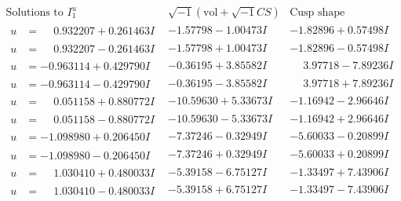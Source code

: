 \documentclass[1p]{elsarticle_modified}
\theoremstyle{definition}
\newcommand{\I}{\sqrt{-1}}
\begin{document}
$$\begin{array}{c|c|c}  
\text{Solutions to }I^u_{1}& \I (\text{vol} + \sqrt{-1}CS) & \text{Cusp shape}\\
 \hline 
\begin{aligned}
u &= \phantom{-}0.932207 + 0.261463 I\end{aligned}
 & -1.57798 - 1.00473 I & -1.82896 + 0.57498 I \\ \hline\begin{aligned}
u &= \phantom{-}0.932207 - 0.261463 I\end{aligned}
 & -1.57798 + 1.00473 I & -1.82896 - 0.57498 I \\ \hline\begin{aligned}
u &= -0.963114 + 0.429790 I\end{aligned}
 & -0.36195 + 3.85582 I & \phantom{-}3.97718 - 7.89236 I \\ \hline\begin{aligned}
u &= -0.963114 - 0.429790 I\end{aligned}
 & -0.36195 - 3.85582 I & \phantom{-}3.97718 + 7.89236 I \\ \hline\begin{aligned}
u &= \phantom{-}0.051158 + 0.880772 I\end{aligned}
 & -10.59630 + 5.33673 I & -1.16942 - 2.96646 I \\ \hline\begin{aligned}
u &= \phantom{-}0.051158 - 0.880772 I\end{aligned}
 & -10.59630 - 5.33673 I & -1.16942 + 2.96646 I \\ \hline\begin{aligned}
u &= -1.098980 + 0.206450 I\end{aligned}
 & -7.37246 - 0.32949 I & -5.60033 - 0.20899 I \\ \hline\begin{aligned}
u &= -1.098980 - 0.206450 I\end{aligned}
 & -7.37246 + 0.32949 I & -5.60033 + 0.20899 I \\ \hline\begin{aligned}
u &= \phantom{-}1.030410 + 0.480033 I\end{aligned}
 & -5.39158 - 6.75127 I & -1.33497 + 7.43906 I \\ \hline\begin{aligned}
u &= \phantom{-}1.030410 - 0.480033 I\end{aligned}
 & -5.39158 + 6.75127 I & -1.33497 - 7.43906 I \\ \hline\begin{aligned}

\end{aligned}
\end{array}$$
\end{document}
